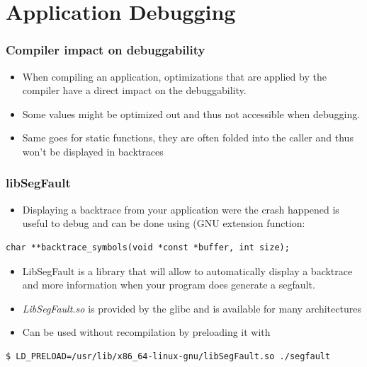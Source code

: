 \section{Application Debugging}

\begin{frame}
  \frametitle{Compiler impact on debuggability}
  \begin{itemize}
    \item When compiling an application, optimizations that are applied by the
          compiler have a direct impact on the debuggability.
    \item Some values might be optimized out and thus not accessible when
          debugging.
    \item Same goes for static functions, they are often folded into the caller
          and thus won't be displayed in backtraces
  \end{itemize}
\end{frame}

\begin{frame}[fragile]
  \frametitle{libSegFault}
  \begin{itemize}
      \item Displaying a backtrace from your application were the crash happened
            is useful to debug and can be done using 
            (GNU extension function:
  \end{itemize}
    \begin{block}{}
      \begin{verbatim}
char **backtrace_symbols(void *const *buffer, int size);
      \end{verbatim}
    \end{block}

  \begin{itemize}
    \item LibSegFault is a library that will allow to automatically display a
          backtrace and more information when your program does generate a
          segfault.
    \item {\em LibSegFault.so} is provided by the glibc and is available for
          many architectures
    \item Can be used without recompilation by preloading it with 
  \end{itemize}
  \begin{block}{}
    \begin{verbatim}
$ LD_PRELOAD=/usr/lib/x86_64-linux-gnu/libSegFault.so ./segfault
    \end{verbatim}
  \end{block}
\end{frame}


